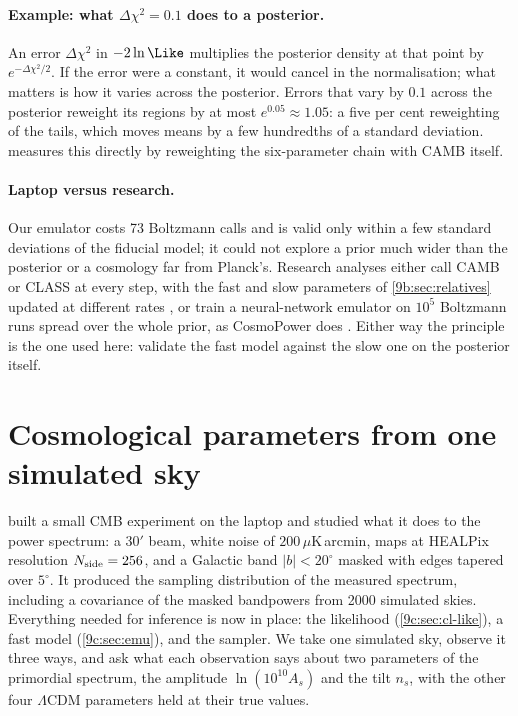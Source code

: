 \paragraph{Example: what $\Delta\chi^2=0.1$ does to a posterior.} An error $\Delta\chi^2$ in $-2\ln\Like$
multiplies the posterior density at that point by $e^{-\Delta\chi^2/2}$. If the error were a constant, it would
cancel in the normalisation; what matters is how it varies across the posterior. Errors that vary by $0.1$
across the posterior reweight its regions by at most $e^{0.05}\approx1.05$: a five per cent reweighting of
the tails, which moves means by a few hundredths of a standard deviation.  measures
this directly by reweighting the six-parameter chain with CAMB itself.

\paragraph{Laptop versus research.} Our emulator costs 73 Boltzmann calls and is valid only within a few
standard deviations of the fiducial model; it could not explore a prior much wider than the posterior or a
cosmology far from Planck's. Research analyses either call CAMB or CLASS at every step, with the fast and
slow parameters of \cref{9b:sec:relatives} updated at different rates \cite{LewisBridle2002}, or train a
neural-network emulator on $10^5$ Boltzmann runs spread over the whole prior, as CosmoPower does
\cite{SpurioMancini2022}. Either way the principle is the one used here: validate the fast model against the
slow one on the posterior itself.
\section{Cosmological parameters from one simulated sky}
\label{9c:sec:toy}

 built a small CMB experiment on the laptop and studied what it does to the power spectrum: a
$30'$ beam, white noise of $200\,\mu$K\,arcmin, maps at HEALPix resolution $N_{\rm side}=256$, and a Galactic
band $|b|<20^\circ$ masked with edges tapered over $5^\circ$. It produced the sampling distribution of the
measured spectrum, including a covariance of the masked bandpowers from 2000 simulated skies. Everything
needed for inference is now in place: the likelihood (\cref{9c:sec:cl-like}), a fast model
(\cref{9c:sec:emu}), and the sampler. We take one simulated sky, observe it three ways, and ask what each
observation says about two parameters of the primordial spectrum, the amplitude $\ln(10^{10}A_s)$ and the
tilt $n_s$, with the other four $\Lambda$CDM parameters held at their true values.

